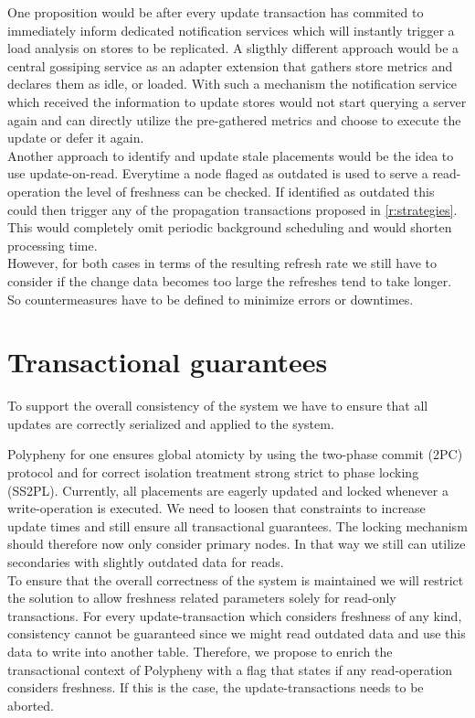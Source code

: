 One proposition would be after every update transaction has commited to immediately inform dedicated notification services which will instantly trigger 
a load analysis on stores to be replicated. A sligthly different approach would be a central gossiping service as an adapter extension that gathers store metrics 
and declares them as idle, or loaded. With such a mechanism the notification service which received the information to update stores would not start querying a server
again and can directly utilize the pre-gathered metrics and choose to execute the update or defer it again.\\

Another approach to identify and update stale placements would be the idea to use update-on-read. Everytime a node flaged as outdated is used to serve a 
read-operation the level of freshness can be checked. If identified as outdated this could then trigger any of the propagation transactions proposed in 
\ref{r:strategies}. This would completely omit periodic background scheduling and would shorten processing time.\\
 
However, for both cases in terms of the resulting refresh rate we still have to consider if the change data becomes too large the refreshes tend to take longer.
So countermeasures have to be defined to minimize errors or downtimes.






\section{Transactional guarantees}
\label{consistency}

To support the overall consistency of the system we have to ensure that all updates are correctly serialized and applied to the system.

Polypheny for one ensures global atomicty by using the two-phase commit (2PC) protocol and for correct isolation treatment
strong strict to phase locking (SS2PL). Currently, all placements are eagerly updated and locked whenever a write-operation is executed.
We need to loosen that constraints to increase update times and still ensure all transactional guarantees. The locking mechanism should therefore 
now only consider primary nodes. In that way we still can utilize secondaries with slightly outdated data for reads.\\

To ensure that the overall correctness of the system is maintained we will restrict the solution to allow freshness related parameters solely
for read-only transactions. For every update-transaction which considers freshness of any kind, consistency cannot be guaranteed since we might read outdated data
and use this data to write into another table. Therefore, we propose to enrich  the transactional context of Polypheny with a flag that states if any read-operation 
considers freshness. If this is the case, the update-transactions needs to be aborted.\\


